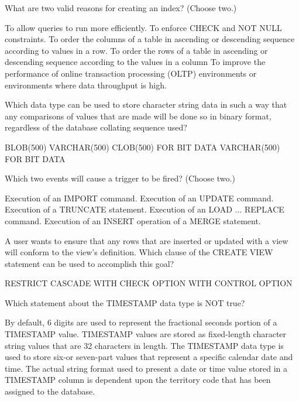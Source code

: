 \documentclass[11pt]{exam}
\begin{document}
\begin{questions}
\question[1]
What are two valid reasons for creating an index? (Choose two.)
\begin{choices}
\choice To allow queries to run more efficiently.
\choice To enforce CHECK and NOT NULL constraints.
\choice To order the columns of a table in ascending or descending sequence according to values in a row.
\choice To order the rows of a table in ascending or descending sequence according to the values in a 
column
\choice To improve the performance of online transaction processing (OLTP) environments or environments
where data throughput is high.
\end{choices}

\question[1]
Which data type can be used to store character string data in such a way that any comparisons of values
that are made will be done so in binary format, regardless of the database collating sequence used?
\begin{choices}
\choice BLOB(500)
\choice VARCHAR(500)
\choice CLOB(500) FOR BIT DATA
\choice VARCHAR(500) FOR BIT DATA
\end{choices}

\question[1]
Which two events will cause a trigger to be fired? (Choose two.)
\begin{choices}
\choice Execution of an IMPORT command.
\choice Execution of an UPDATE command.
\choice Execution of a TRUNCATE statement.
\choice Execution of an LOAD ... REPLACE command.
\choice Execution of an INSERT operation of a MERGE statement.
\end{choices}

\question[1]
A user wants to ensure that any rows that are inserted or updated with a view will conform to the view's
definition. Which clause of the CREATE VIEW statement can be used to accomplish this goal?
\begin{choices}
\choice RESTRICT
\choice CASCADE
\choice WITH CHECK OPTION
\choice WITH CONTROL OPTION
\end{choices}

\question[1]
Which statement about the TIMESTAMP data type is NOT true?
\begin{choices}
\choice By default, 6 digits are used to represent the fractional seconds portion of a TIMESTAMP value.
\choice TIMESTAMP values are stored as fixed-length character string values that are 32 characters in
length.
\choice The TIMESTAMP data type is used to store six-or seven-part values that represent a specific
calendar date and time.
\choice The actual string format used to present a date or time value stored in a TIMESTAMP column is 
dependent upon the territory code that has been assigned to the database.
\end{choices}


\end{questions}
\end{document}
